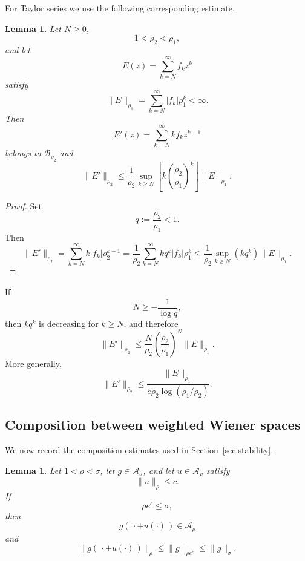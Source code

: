 \documentclass[11pt,a4paper]{amsart}
\newtheorem{lemma}[theorem]{Lemma}
\begin{document}
For Taylor series we use the following corresponding estimate.

\begin{lemma}\label{lem:derivative}
	Let $N\ge0$,
	\[
	1<\rho_2<\rho_1,
	\]
	and let
	\[
	E(z)=\sum_{k=N}^\infty f_kz^k
	\]
	satisfy
	\[
	\|E\|_{\rho_1}
	=
	\sum_{k=N}^\infty|f_k|\rho_1^k
	<\infty.
	\]
	Then
	\[
	E'(z)
	=
	\sum_{k=N}^\infty kf_kz^{k-1}
	\]
	belongs to $\mathcal B_{\rho_2}$ and
	\begin{equation}\label{eq:derivative-tail-general}
		\|E'\|_{\rho_2}
		\le
		\frac1{\rho_2}
		\sup_{k\ge N}
		\left[
		k\left(\frac{\rho_2}{\rho_1}\right)^k
		\right]
		\|E\|_{\rho_1}.
	\end{equation}
\end{lemma}

\begin{proof}
	Set
	\[
	q:=\frac{\rho_2}{\rho_1}<1.
	\]
	Then
	\[
		\|E'\|_{\rho_2}=\sum_{k=N}^\infty k|f_k|\rho_2^{k-1}=
		\frac1{\rho_2}\sum_{k=N}^\infty kq^k|f_k|\rho_1^k\le
		\frac1{\rho_2}\sup_{k\ge N}(kq^k)\|E\|_{\rho_1}.
	\]
\end{proof}

If
\[
N\ge-\frac1{\log q},
\]
then $kq^k$ is decreasing for $k\ge N$, and therefore
\begin{equation}\label{eq:derivative-tail-sharp}
	\|E'\|_{\rho_2}
	\le
	\frac{N}{\rho_2}
	\left(\frac{\rho_2}{\rho_1}\right)^N
	\|E\|_{\rho_1}.
\end{equation}
More generally,
\begin{equation}\label{eq:derivative-tail-uniform}
	\|E'\|_{\rho_2}
	\le
	\frac{
		\|E\|_{\rho_1}
	}{
		e\rho_2\log(\rho_1/\rho_2)
	}.
\end{equation}


\subsection{Composition between weighted Wiener spaces}
\label{sec:appendix-composition}

We now record the composition estimates used in
Section~\ref{sec:stability}.

\begin{lemma}\label{lem:composition-appendix}
	Let $1<\rho<\sigma$, let $g\in\mathcal A_\sigma$, and let
	$u\in\mathcal A_\rho$ satisfy
	\[
	\|u\|_\rho\le c.
	\]
	If
	\[
	\rho e^c\le\sigma,
	\]
	then
	\[
	g(\,\cdot+u(\cdot)\,)\in\mathcal A_\rho
	\]
	and
	\begin{equation}\label{eq:composition-appendix}
		\|g(\,\cdot+u(\cdot)\,)\|_\rho
		\le
		\|g\|_{\rho e^c}
		\le
		\|g\|_\sigma.
	\end{equation}
\end{lemma}
\end{document}
